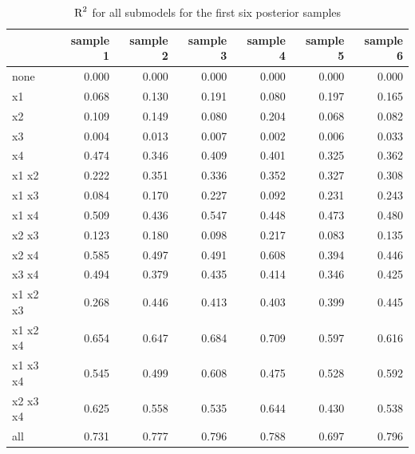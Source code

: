 \documentclass[11pt,a4paper,twoside]{book}\usepackage[]{graphicx}\usepackage[]{color}
\newenvironment{knitrout}{}{} %
\begin{document}
\begin{knitrout}
\color{fgcolor}\begin{table}

\caption{\label{tab:simdata.postsample3}$ \text{R}^2$ for all submodels for the first six posterior samples}
\centering
\begin{tabular}[t]{lrrrrrr}
\toprule
  & sample 1 & sample 2 & sample 3 & sample 4 & sample 5 & sample 6\\
\midrule
none & 0.000 & 0.000 & 0.000 & 0.000 & 0.000 & 0.000\\
x1 & 0.068 & 0.130 & 0.191 & 0.080 & 0.197 & 0.165\\
x2 & 0.109 & 0.149 & 0.080 & 0.204 & 0.068 & 0.082\\
x3 & 0.004 & 0.013 & 0.007 & 0.002 & 0.006 & 0.033\\
x4 & 0.474 & 0.346 & 0.409 & 0.401 & 0.325 & 0.362\\
x1 x2 & 0.222 & 0.351 & 0.336 & 0.352 & 0.327 & 0.308\\
x1 x3 & 0.084 & 0.170 & 0.227 & 0.092 & 0.231 & 0.243\\
x1 x4 & 0.509 & 0.436 & 0.547 & 0.448 & 0.473 & 0.480\\
x2 x3 & 0.123 & 0.180 & 0.098 & 0.217 & 0.083 & 0.135\\
x2 x4 & 0.585 & 0.497 & 0.491 & 0.608 & 0.394 & 0.446\\
x3 x4 & 0.494 & 0.379 & 0.435 & 0.414 & 0.346 & 0.425\\
x1 x2 x3 & 0.268 & 0.446 & 0.413 & 0.403 & 0.399 & 0.445\\
x1 x2 x4 & 0.654 & 0.647 & 0.684 & 0.709 & 0.597 & 0.616\\
x1 x3 x4 & 0.545 & 0.499 & 0.608 & 0.475 & 0.528 & 0.592\\
x2 x3 x4 & 0.625 & 0.558 & 0.535 & 0.644 & 0.430 & 0.538\\
all & 0.731 & 0.777 & 0.796 & 0.788 & 0.697 & 0.796\\
\bottomrule
\end{tabular}
\end{table}


\end{knitrout}
\end{document}
